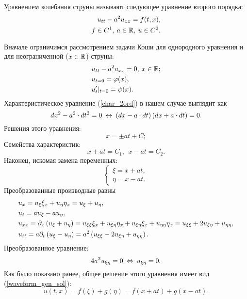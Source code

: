     \begin{Def}
        Уравнением колебания струны называют следующее уравнение второго порядка:
        \begin{align*}
            u_{tt} - a^2 u_{xx} = f(t, x), \\
            f \in C^1,\: a \in \mathbb{R},\: u \in C^2.
        \end{align*}
    \end{Def}
    Вначале ограничимся рассмотрением задачи Коши для однородного уравнения и для неограниченной ($x \in \mathbb{R}$) струны:
    \begin{align*}
        & u_{tt} - a^2 u_{xx} = 0,\: x \in \mathbb{R};\\
        & u_{t=0} = \varphi(x),\\
        & u'_t|_{t=0} = \psi(x).
    \end{align*}
    Характеристическое уравнение (\ref{char_2ord}) в нашем случае выглядит как
    \begin{equation*}
        dx^2 - a^2\cdot dt^2 = 0 \: \leftrightarrow \: \left({dx - a\cdot dt}\right)\left({dx + a\cdot dt}\right) = 0.
    \end{equation*}
    Решения этого уравнения:
    \begin{equation*}
        x = \pm at + C;
    \end{equation*}
    Семейства характеристик:
    \begin{equation*}
        x + at = C_1,\:\: x - at = C_2.
    \end{equation*}
    Наконец, искомая замена переменных:
    \begin{equation*}
        \begin{cases}
            \xi = x + at,\\
            \eta = x - at.
        \end{cases}
    \end{equation*}
    Преобразованные производные равны
    \begin{align*}
        & u_x = u_{\xi} \xi_x + u_{\eta} \eta_x = u_{\xi} + u_{\eta},\\
        & u_t = au_{\xi} - au_{\eta},\\
        & u_{xx} = \partial_x\left({u_{\xi} + u_{\eta}}\right) = u_{\xi\xi} \xi_x + u_{\xi\eta} \eta_x + u_{\xi\eta} \xi_x + u_{\eta\eta} \eta_x = u_{\xi\xi} + 2u_{\xi\eta} + u_{\eta\eta},\\
        & u_{tt} = a\partial_t \left({u_{\xi} - u_{\eta}}\right) = a^2\left({u_{\xi\xi} - 2u_{\xi\eta} + u_{\eta\eta}}\right).
    \end{align*}
    Преобразованное уравнение:
    \begin{equation*}
        4a^2u_{\xi\eta} = 0 \: \Leftrightarrow \: u_{\xi\eta} = 0.
    \end{equation*}
    Как было показано ранее, общее решение этого уравнения имеет вид (\ref{waveform_gen_sol}):
    \begin{equation*}
        u(t,x) = f(\xi) + g(\eta) = f(x + at) + g(x - at).
    \end{equation*}

